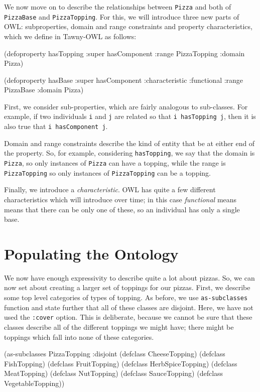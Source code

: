 We now move on to describe the relationships between \verb~Pizza~ and both of
\verb~PizzaBase~ and \verb~PizzaTopping~. For this, we will introduce three new parts of
OWL: subproperties, domain and range constraints and property characteristics,
which we define in Tawny-OWL as follows:

\begin{tawny}
(defoproperty hasTopping
  :super hasComponent
  :range PizzaTopping
  :domain Pizza)

(defoproperty hasBase
  :super hasComponent
  :characteristic :functional
  :range PizzaBase
  :domain Pizza)
\end{tawny}


First, we consider sub-properties, which are fairly analogous to sub-classes.
For example, if two individuals \verb~i~ and \verb~j~ are related so that
\verb~i hasTopping j~, then it is also true that \verb~i hasComponent j~.

Domain and range constraints describe the kind of entity that be at either end
of the property. So, for example, considering \verb~hasTopping~, we say that the
domain is \verb~Pizza~, so only instances of \verb~Pizza~ can have a topping, while the
range is \verb~PizzaTopping~ so only instances of \verb~PizzaTopping~ can be a topping. 

Finally, we introduce a \emph{characteristic}. OWL has quite a few different
characteristics which will introduce over time; in this case \emph{functional}
means means that there can be only one of these, so an individual has only a
single base.


\section{Populating the Ontology}
\label{sec-5-4}

We now have enough expressivity to describe quite a lot about pizzas. So, we
can now set about creating a larger set of toppings for our pizzas. First, we
describe some top level categories of types of topping. As before, we use
\verb~as-subclasses~ function and state further that all of these classes are
disjoint. Here, we have not used the \verb~:cover~ option. This is deliberate,
because we cannot be sure that these classes describe all of the different
toppings we might have; there might be toppings which fall into none of these
categories. 

\begin{tawny}
(as-subclasses
 PizzaTopping
 :disjoint
 (defclass CheeseTopping)
 (defclass FishTopping)
 (defclass FruitTopping)
 (defclass HerbSpiceTopping)
 (defclass MeatTopping)
 (defclass NutTopping)
 (defclass SauceTopping)
 (defclass VegetableTopping))
\end{tawny}

